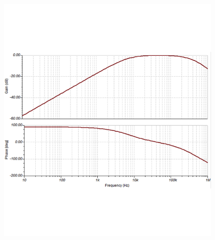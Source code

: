 \begin{frame}
\begin{figure}
\begin{minipage}{0.45\textwidth}
            \includegraphics[width=\textwidth]{fig/Bandpass_20kHz-100kHz_Freq.png}
        \end{minipage}
    \end{figure}
\end{frame}
